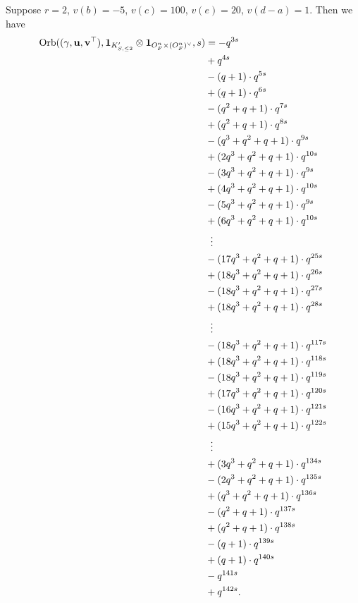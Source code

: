 \begin{example}
  Suppose $r = 2$, $v(b) = -5$, $v(c) = 100$, $v(e) = 20$, $v(d-a) = 1$.
  Then we have
  \begin{align*}
    \Orb(\guv, \mathbf{1}_{K'_{S, \le 2}} \otimes \oneV, s)
    &= -q^{3s} \\
    &+ q^{4s} \\
    &- (q+1) \cdot q^{5s} \\
    &+ (q+1) \cdot q^{6s} \\
    &- (q^2+q+1) \cdot q^{7s} \\
    &+ (q^2+q+1) \cdot q^{8s} \\
    &- (q^3+q^2+q+1) \cdot q^{9s} \\
    &+ (2q^3+q^2+q+1) \cdot q^{10s} \\
    &- (3q^3+q^2+q+1) \cdot q^{9s} \\
    &+ (4q^3+q^2+q+1) \cdot q^{10s} \\
    &- (5q^3+q^2+q+1) \cdot q^{9s} \\
    &+ (6q^3+q^2+q+1) \cdot q^{10s} \\
    &\vdotswithin= \\
    &- (17q^3+q^2+q+1) \cdot q^{25s} \\
    &+ (18q^3+q^2+q+1) \cdot q^{26s} \\
    &- (18q^3+q^2+q+1) \cdot q^{27s} \\
    &+ (18q^3+q^2+q+1) \cdot q^{28s} \\
    &\vdotswithin= \\
    &- (18q^3+q^2+q+1) \cdot q^{117s} \\
    &+ (18q^3+q^2+q+1) \cdot q^{118s} \\
    &- (18q^3+q^2+q+1) \cdot q^{119s} \\
    &+ (17q^3+q^2+q+1) \cdot q^{120s} \\
    &- (16q^3+q^2+q+1) \cdot q^{121s} \\
    &+ (15q^3+q^2+q+1) \cdot q^{122s} \\
    &\vdotswithin= \\
    &+ (3q^3+q^2+q+1) \cdot q^{134s} \\
    &- (2q^3+q^2+q+1) \cdot q^{135s} \\
    &+ (q^3+q^2+q+1) \cdot q^{136s} \\
    &- (q^2+q+1) \cdot q^{137s} \\
    &+ (q^2+q+1) \cdot q^{138s} \\
    &- (q+1) \cdot q^{139s} \\
    &+ (q+1) \cdot q^{140s} \\
    &- q^{141s} \\
    &+ q^{142s}.
  \end{align*}
\end{example}

